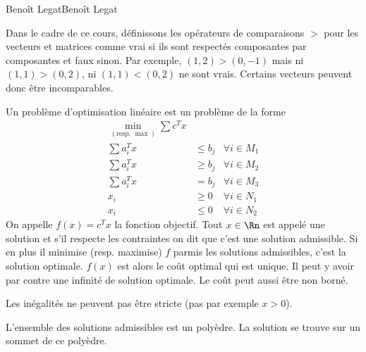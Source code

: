 

{Benoît Legat}{Benoît Legat}

\newcommand{\libre}{\ensuremath{\textrm{ libre}}}
\newcommand{\redcost}{\tilde{c}} %


\begin{mydef}
  Dans le cadre de ce cours, définissons les opérateurs de comparaisons $>$
  pour les vecteurs et matrices comme vrai si ils sont respectés composantes
  par composantes et faux sinon.
  Par exemple, $(1, 2) > (0, -1)$ mais ni $(1, 1) > (0, 2)$,
  ni $(1, 1) < (0, 2)$ ne sont vrais.
  Certains vecteurs peuvent donc être incomparables.
\end{mydef}

\begin{mydef}
  Un problème d'optimisation linéaire est un problème de la forme
  \begin{align*}
    \min_{(\text{resp. }\max)} \sum c^T x\\
    \sum a_i^T x & \leq b_j & \forall i \in M_1\\
    \sum a_i^T x & \geq b_j & \forall i \in M_2\\
    \sum a_i^T x & = b_j & \forall i \in M_3\\
    x_i & \geq 0 & \forall i \in N_1\\
    x_i & \leq 0 & \forall i \in N_2
  \end{align*}
  On appelle $f(x) = c^Tx$ la fonction objectif.
  Tout $x \in \Rn$ est appelé une solution et s'il respecte les contraintes
  on dit que c'est une solution admissible.
  Si en plus il minimise (resp. maximise) $f$ parmis les solutions admissibles,
  c'est la solution optimale.
  $f(x)$ est alors le coût optimal qui est unique.
  Il peut y avoir par contre une infinité de solution optimale.
  Le coût peut aussi être non borné.
\end{mydef}

\begin{myrem}
  Les inégalités ne peuvent pas être stricte (pas par exemple $x > 0$).
\end{myrem}
\begin{myrem}
  L'ensemble des solutions admissibles est un polyèdre.
  La solution se trouve sur un sommet de ce polyèdre.
\end{myrem}

